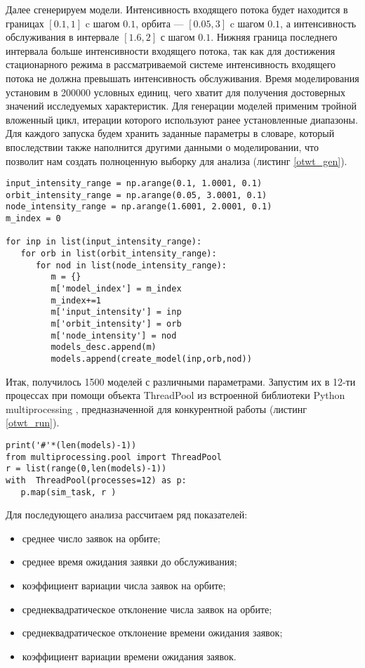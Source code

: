 Далее сгенерируем модели. Интенсивность входящего потока будет находится в границах $[0.1,1]$ c шагом $0.1$, орбита --- $[0.05,3]$ c шагом $0.1$, а интенсивность обслуживания в интервале $[1.6,2]$ с шагом $0.1$. Нижняя граница последнего интервала больше интенсивности входящего потока, так как для достижения стационарного режима в рассматриваемой системе интенсивность входящего потока не должна превышать интенсивность обслуживания. Время моделирования установим в 200000 условных единиц, чего хватит для получения достоверных значений исследуемых характеристик. Для генерации моделей применим тройной вложенный цикл, итерации которого используют ранее установленные диапазоны. Для каждого запуска будем хранить заданные параметры в словаре, который впоследствии также наполнится другими данными о моделировании, что позволит нам создать полноценную выборку для анализа (листинг \ref{otwt_gen}).
\begin{lstlisting}
input_intensity_range = np.arange(0.1, 1.0001, 0.1)
orbit_intensity_range = np.arange(0.05, 3.0001, 0.1)
node_intensity_range = np.arange(1.6001, 2.0001, 0.1)
m_index = 0

for inp in list(input_intensity_range):
   for orb in list(orbit_intensity_range):
      for nod in list(node_intensity_range):
         m = {}
         m['model_index'] = m_index
         m_index+=1
         m['input_intensity'] = inp
         m['orbit_intensity'] = orb
         m['node_intensity'] = nod
         models_desc.append(m)
         models.append(create_model(inp,orb,nod))
\end{lstlisting}

Итак, получилось 1500 моделей с различными параметрами. Запустим их в 12-ти процессах при помощи объекта ThreadPool из встроенной библиотеки Python multiprocessing \cite{multiproc}, предназначенной для конкурентной работы (листинг \ref{otwt_run}).
\begin{lstlisting}
print('#'*(len(models)-1))
from multiprocessing.pool import ThreadPool
r = list(range(0,len(models)-1))
with  ThreadPool(processes=12) as p:
   p.map(sim_task, r )
\end{lstlisting}

Для последующего анализа рассчитаем ряд показателей:
\begin{itemize}
	\item среднее число заявок на орбите;
	\item среднее время ожидания заявки до обслуживания;
	\item коэффициент вариации числа заявок на орбите;
	\item среднеквадратическое отклонение числа заявок на орбите;
	\item среднеквадратическое отклонение времени ожидания заявок;
	\item коэффициент вариации времени ожидания заявок.
\end{itemize}

